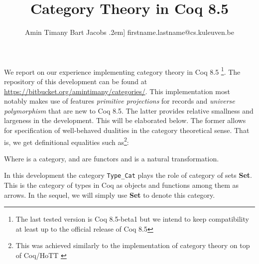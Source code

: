 \documentclass[9pt, twocolumn]{extarticle}
\begin{document}
\title{Category Theory in Coq 8.5}
\author{Amin Timany \hspace{2em} Bart Jacobs \0.2em]
firstname.lastname@cs.kuleuven.be}
\date{}

\maketitle

We report on our experience implementing category theory in Coq 8.5
\footnote{The last tested version is Coq 8.5-beta1 but we intend to keep compatibility at least up to the official release of Coq 8.5}.
The repository of this development can be found at \url{https://bitbucket.org/amintimany/categories/}.
This implementation most notably makes use of features \emph{primitive projections} for records and \emph{universe polymorphism} that are new to Coq 8.5.
The latter provides relative smallness and largeness in the development.
This will be elaborated below.
The former allows for specification of well-behaved dualities in the category theoretical sense.
That is, we get definitional equalities such as\footnote{This was achieved similarly to the implementation of category theory on top of Coq/HoTT \cite{DBLP:conf/itp/GrossCS14}}:


Where  is a category,  and  are functors and  is a natural transformation.

In this development the category \texttt{Type\_Cat} plays the role of category of sets \textbf{Set}. This is the category of types in Coq as objects and functions among them as arrows. In the sequel, we will simply use \textbf{Set} to denote this category.
\end{document}
